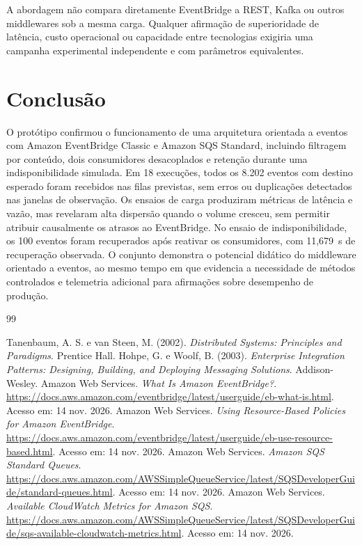 \documentclass[12pt]{article}
\begin{document}
A abordagem não compara diretamente EventBridge a REST, Kafka ou outros
middlewares sob a mesma carga. Qualquer afirmação de superioridade de
latência, custo operacional ou capacidade entre tecnologias exigiria uma
campanha experimental independente e com parâmetros equivalentes.

\section{Conclusão}
O protótipo confirmou o funcionamento de uma arquitetura orientada a eventos
com Amazon EventBridge Classic e Amazon SQS Standard, incluindo filtragem
por conteúdo, dois consumidores desacoplados e retenção durante uma
indisponibilidade simulada. Em 18 execuções, todos os 8.202 eventos com
destino esperado foram recebidos nas filas previstas, sem erros ou
duplicações detectados nas janelas de observação. Os ensaios de carga
produziram métricas de latência e vazão, mas revelaram alta dispersão
quando o volume cresceu, sem permitir atribuir causalmente os atrasos ao
EventBridge. No ensaio de indisponibilidade, os 100 eventos foram
recuperados após reativar os consumidores, com 11,679~s de recuperação
observada. O conjunto demonstra o potencial didático do middleware
orientado a eventos, ao mesmo tempo em que evidencia a necessidade de
métodos controlados e telemetria adicional para afirmações sobre desempenho
de produção.

\begin{thebibliography}{99}
\raggedright
{} Tanenbaum, A. S. e van Steen, M. (2002).
\emph{Distributed Systems: Principles and Paradigms}. Prentice Hall.
 Hohpe, G. e Woolf, B. (2003).
\emph{Enterprise Integration Patterns: Designing, Building, and Deploying Messaging Solutions}.
Addison-Wesley.
 Amazon Web Services. \emph{What Is Amazon EventBridge?}.
\url{https://docs.aws.amazon.com/eventbridge/latest/userguide/eb-what-is.html}.
Acesso em: 14 nov. 2026.
 Amazon Web Services. \emph{Using Resource-Based Policies for Amazon EventBridge}.
\url{https://docs.aws.amazon.com/eventbridge/latest/userguide/eb-use-resource-based.html}.
Acesso em: 14 nov. 2026.
 Amazon Web Services. \emph{Amazon SQS Standard Queues}.
\url{https://docs.aws.amazon.com/AWSSimpleQueueService/latest/SQSDeveloperGuide/standard-queues.html}.
Acesso em: 14 nov. 2026.
 Amazon Web Services. \emph{Available CloudWatch Metrics for Amazon SQS}.
\url{https://docs.aws.amazon.com/AWSSimpleQueueService/latest/SQSDeveloperGuide/sqs-available-cloudwatch-metrics.html}.
Acesso em: 14 nov. 2026.
\end{thebibliography}
\end{document}
